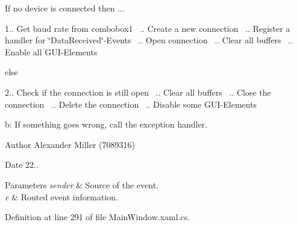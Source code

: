 \begin{DoxyEnumerate}
\item If no device is connected then ...

1.. Get baud rate from combobox1 ~.. Create a new connection ~.. Register a handler for \char`\"{}\+Data\+Received\char`\"{}-\/\+Events ~.. Open connection ~.. Clear all buffers ~.. Enable all G\+U\+I-\/\+Elements ~\newline

\item else

2.. Check if the connection is still open ~.. Clear all buffers ~.. Close the connection ~.. Delete the connection ~.. Disable some G\+U\+I-\/\+Elements
\end{DoxyEnumerate}

b\+: If something goes wrong, call the exception handler.

\begin{DoxyAuthor}{Author}
Alexander Miller (7089316) 
\end{DoxyAuthor}
\begin{DoxyDate}{Date}
22..
\end{DoxyDate}

\begin{DoxyParams}{Parameters}
{\em sender} & Source of the event. \\
\hline
{\em e} & Routed event information. \\
\hline
\end{DoxyParams}


Definition at line 291 of file Main\+Window.\+xaml.\+cs.


